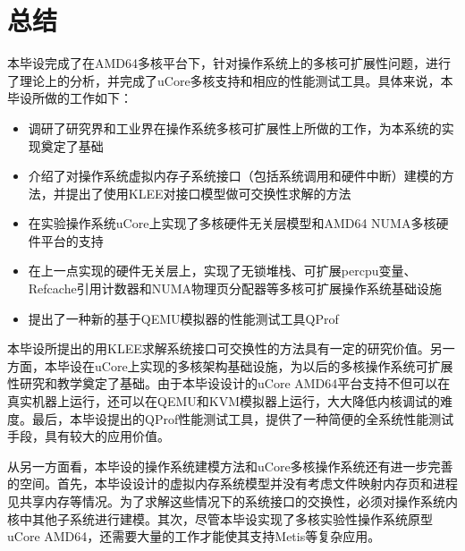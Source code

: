 
\chapter{总结}

本毕设完成了在AMD64多核平台下，针对操作系统上的多核可扩展性问题，进行了理论上的分析，并完成了uCore多核支持和相应的性能测试工具。具体来说，本毕设所做的工作如下：

\begin{itemize}
	\item
	调研了研究界和工业界在操作系统多核可扩展性上所做的工作，为本系统的实现奠定了基础
	\item
	介绍了对操作系统虚拟内存子系统接口（包括系统调用和硬件中断）建模的方法，并提出了使用KLEE对接口模型做可交换性求解的方法
	\item 在实验操作系统uCore上实现了多核硬件无关层模型和AMD64 NUMA多核硬件平台的支持
	\item
	在上一点实现的硬件无关层上，实现了无锁堆栈、可扩展percpu变量、Refcache引用计数器和NUMA物理页分配器等多核可扩展操作系统基础设施
	\item 提出了一种新的基于QEMU模拟器的性能测试工具QProf
\end{itemize}

本毕设所提出的用KLEE求解系统接口可交换性的方法具有一定的研究价值。另一方面，本毕设在uCore上实现的多核架构基础设施，为以后的多核操作系统可扩展性研究和教学奠定了基础。由于本毕设设计的uCore
AMD64平台支持不但可以在真实机器上运行，还可以在QEMU和KVM模拟器上运行，大大降低内核调试的难度。最后，本毕设提出的QProf性能测试工具，提供了一种简便的全系统性能测试手段，具有较大的应用价值。

从另一方面看，本毕设的操作系统建模方法和uCore多核操作系统还有进一步完善的空间。首先，本毕设设计的虚拟内存系统模型并没有考虑文件映射内存页和进程见共享内存等情况。为了求解这些情况下的系统接口的交换性，必须对操作系统内核中其他子系统进行建模。其次，尽管本毕设实现了多核实验性操作系统原型uCore
AMD64，还需要大量的工作才能使其支持Metis\cite{linux:osdi10}等复杂应用。

